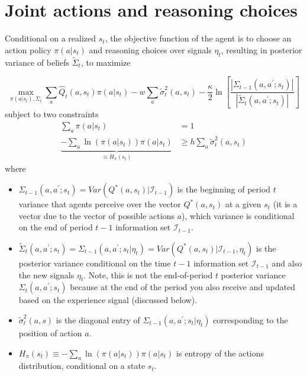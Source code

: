 \documentclass[12pt]{article}%
\begin{document}
\section{Joint actions and reasoning choices}

Conditional on a realized $s_{t}$, the objective function of the agent is to
choose an action policy $\pi(a|s_{t})$ and reasoning choices over signals
$\eta_{t}$, resulting in posterior variance of beliefs $\tilde\Sigma_{t}$, to maximize%

\[
\max_{\pi(a|s_{t}), \Sigma_{t}} \sum_{a}\widehat{Q}_{t}(a,s_{t})\pi
(a|s_{t})-w\sum_{a}\widetilde\sigma_{t}^{2}(a,s_{t})- \frac{\kappa}{2}
\ln\left[  \frac{| \Sigma_{t-1}(a,a^{\prime};s_{t})|}{|\widetilde\Sigma
_{t}(a,a^{\prime};s_{t} )|}\right]
\]
subject to two constraints
\begin{align*}
\sum_{a}\pi(a|s_{t})  &  =1\\
\underbrace{-\sum_{a}\ln(\pi(a|s_{t}))\pi(a|s_{t})}_{\equiv H_{\pi}(s_{t})}
&  \geq h\sum_{a}\widetilde\sigma_{t}^{2}(a,s_{t})
\end{align*}
where

\begin{itemize}


\item[--] $\Sigma_{t-1}(a,a^{\prime}; s_{t}) = Var(Q^{*}(a,s_{t}) |
\mathcal{I}_{t-1})$ is the beginning of period $t$ variance that agents
perceive over the vector $Q^{*}(a,s_{t})$ at a given $s_{t}$ (it is a vector
due to the vector of possible actions $a$), which variance is conditional on
the end of period $t-1$ information set $\mathcal{I}_{t-1}$. 

\item[--] $\widetilde\Sigma_{t}(a,a^{\prime};s_{t}) = \Sigma_{t-1}(a,
a^{\prime}; s_{t} | \eta_{t}) = Var(Q^{*}(a,s_{t})| \mathcal{I}_{t-1},
\eta_{t})$ is the posterior variance conditional on the time $t-1$ information
set $\mathcal{I}_{t-1}$ and also the new signals $\eta_{t}$. Note, this is not
the end-of-period $t$ posterior variance $\Sigma_{t}(a,a^{\prime}; s_{t})$
because at the end of the period you also receive and updated based on the
experience signal (discussed below). 

\item[--] $\widetilde\sigma_{t}^{2}(a,s)$ is the diagonal entry of
$\Sigma_{t-1}(a,a^{\prime};s_{t} | \eta_{t})$ corresponding to the position of
action $a$. 

\item[--] $H_{\pi}(s_{t}) \equiv-\sum_{a}\ln(\pi(a|s_{t}))\pi(a|s_{t})$ is
entropy of the actions  distribution, conditional on a state $s_{t}.$
\end{itemize}
\end{document}
